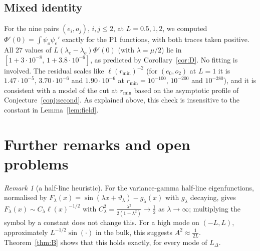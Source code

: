 \documentclass[11pt]{amsart}
\newcommand{\LD}{L_\Delta}
\newcommand{\e}[1]{\cdot 10^{#1}}
\theoremstyle{definition}
\theoremstyle{remark}
\newtheorem{remark}[theorem]{Remark}
\numberwithin{equation}{section}
\begin{document}
\subsection*{Mixed identity}
For the nine pairs $(e_i,o_j)$, $i,j\le2$, at $L=0.5,1,2$, we computed $\Phi'(0)=\int\psi_o\psi_e'$ exactly for the P1 functions, with both traces taken positive. All $27$ values of $L(\lambda_e-\lambda_o)\Phi'(0)$ (with $\lambda=\mu/2$) lie in $[1+3\e{-8},\,1+3.8\e{-6}]$, as predicted by Corollary~\ref{cor:D}. No fitting is involved. The residual scales like $\ell(r_{\min})^{-2}$ (for $(e_0,o_2)$ at $L=1$ it is $1.47\e{-5}$, $3.70\e{-6}$ and $1.90\e{-6}$ at $r_{\min}=10^{-100}$, $10^{-200}$ and $10^{-280}$), and it is consistent with a model of the cut at $r_{\min}$ based on the asymptotic profile of Conjecture~\ref{conj:second}. As explained above, this check is insensitive to the constant in Lemma~\ref{lem:field}.

\section{Further remarks and open problems}\label{sec:remarks}

\begin{remark}[a half-line heuristic]
For the variance-gamma half-line eigenfunctions, normalised by $F_\lambda(x)=\sin(\lambda x+\vartheta_\lambda)-g_\lambda(x)$ with $g_\lambda$ decaying, \cite[Ex.~6.4]{Kw11} gives $F_\lambda(x)\sim C_\lambda\ell(x)^{-1/2}$ with $C_\lambda^2=\frac{\lambda^2}{2(1+\lambda^2)}\to\frac12$ as $\lambda\to\infty$; multiplying the symbol by a constant does not change this. For a high mode on $(-L,L)$, approximately $L^{-1/2}\sin(\cdot)$ in the bulk, this suggests $A^2\approx\frac1{2L}$. Theorem~\ref{thm:B} shows that this holds exactly, for every mode of $\LD$.
\end{remark}
\end{document}
